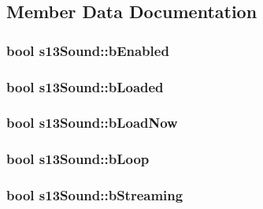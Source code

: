 \subsection{Member Data Documentation}
\hypertarget{classs13_sound_acf7c47ea96f4e61b1a0bc1a8cbd2c26a}{
\subsubsection[{b\-Enabled}]{\setlength{\rightskip}{0pt plus 5cm}bool s13\-Sound\-::b\-Enabled}}\label{classs13_sound_acf7c47ea96f4e61b1a0bc1a8cbd2c26a}
\hypertarget{classs13_sound_ae9599ee7f25d919b73db244e8571f28e}{
\subsubsection[{b\-Loaded}]{\setlength{\rightskip}{0pt plus 5cm}bool s13\-Sound\-::b\-Loaded}}\label{classs13_sound_ae9599ee7f25d919b73db244e8571f28e}
\hypertarget{classs13_sound_ab1a881f7f998787fe95f6491da6a26de}{
\subsubsection[{b\-Load\-Now}]{\setlength{\rightskip}{0pt plus 5cm}bool s13\-Sound\-::b\-Load\-Now}}\label{classs13_sound_ab1a881f7f998787fe95f6491da6a26de}
\hypertarget{classs13_sound_aed6c263295b17e4cff067cf824497ced}{
\subsubsection[{b\-Loop}]{\setlength{\rightskip}{0pt plus 5cm}bool s13\-Sound\-::b\-Loop}}\label{classs13_sound_aed6c263295b17e4cff067cf824497ced}
\hypertarget{classs13_sound_a109f81c7265aa5581a4cbaabb9e8bfdb}{
\subsubsection[{b\-Streaming}]{\setlength{\rightskip}{0pt plus 5cm}bool s13\-Sound\-::b\-Streaming}}\label{classs13_sound_a109f81c7265aa5581a4cbaabb9e8bfdb}
